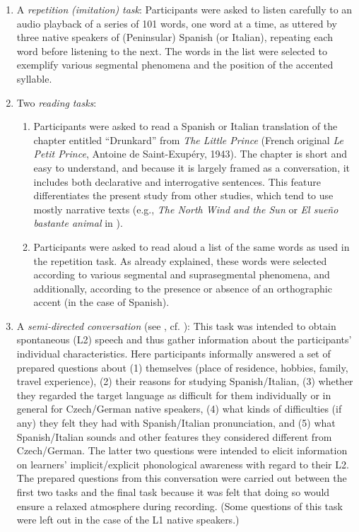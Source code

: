 \begin{enumerate}[label={(\arabic*)}]
\item
A \textit{repetition} \textit{(imitation)} \textit{task}: Participants were asked to listen carefully to an audio playback of a series of 101 words, one word at a time, as uttered by three native speakers of (Peninsular) Spanish (or Italian), repeating each word before listening to the next. The words in the list were selected to exemplify various segmental phenomena and the position of the accented syllable.\pagebreak



\item Two \textit{reading} \textit{tasks}:


\begin{enumerate}[label={\alph*.}]
\item
  Participants were asked to read a Spanish or Italian translation of the chapter entitled “Drunkard” from \textit{The Little Prince} (French original \textit{Le Petit Prince}, Antoine de Saint-Exupéry, 1943). The chapter is short and easy to understand, and because it is largely framed as a conversation, it includes both declarative and interrogative sentences. This feature differentiates the present study from other studies, which tend to use mostly narrative texts (e.g., \textit{The North Wind and the Sun} or \textit{El sueño bastante animal} in \citealt{PustkaEtAl2016,PustkaEtAl2018}).


\item
  Participants were asked to read aloud a list of the same words as used in the repetition task. As already explained, these words were selected according to various segmental and suprasegmental phenomena, and additionally, according to the presence or absence of an orthographic accent (in the case of Spanish).
\end{enumerate}


\item
          A \textit{semi-directed} \textit{conversation} (see \citealt{Silva-CorvalánEnrique-Arias2017}, cf. \citealt{PustkaEtAl2018}): This task was intended to obtain spontaneous (L2) speech and thus gather information about the participants’ individual characteristics. Here participants informally answered a set of prepared questions about (1) themselves (place of residence, hobbies, family, travel experience), (2) their reasons for studying Spanish/Italian, (3) whether they regarded the target language as difficult for them individually or in general for Czech/German native speakers, (4) what kinds of difficulties (if any) they felt they had with Spanish/Italian pronunciation, and (5) what Spanish/Italian sounds and other features they considered different from Czech/German. The latter two questions were intended to elicit information on learners’ implicit/explicit phonological awareness with regard to their L2. The prepared questions from this conversation were carried out between the first two tasks and the final task because it was felt that doing so would ensure a relaxed atmosphere during recording. (Some questions of this task were left out in the case of the L1 native speakers.)




\end{enumerate}

